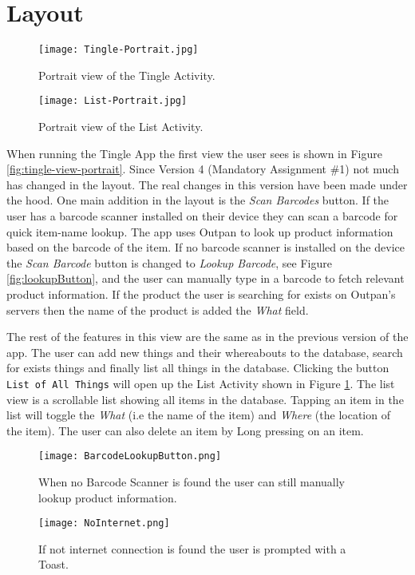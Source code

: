 \section{Layout}

\begin{figure}[!htb]
		\centering
		\texttt{[image: Tingle-Portrait.jpg]}
		\caption{Portrait view of the Tingle Activity.}
		\label{fig:tingle-view-portrait}
	\endminipage\hfill
		\centering
		\texttt{[image: List-Portrait.jpg]}
		\caption{Portrait view of the List Activity.}
		\label{fig:list-view-portrait}
	\endminipage\hfill
\end{figure}

When running the Tingle App the first view the user sees is shown in Figure \ref{fig:tingle-view-portrait}. Since Version 4 (Mandatory Assignment \#1) not much has changed in the layout. The real changes in this version have been made under the hood. One main addition in the layout is the \emph{Scan Barcodes} button. If the user has a barcode scanner installed on their device they can scan a barcode for quick item-name lookup. The app uses Outpan to look up product information based on the barcode of the item. If no barcode scanner is installed on the device the \emph{Scan Barcode} button is changed to \emph{Lookup Barcode}, see Figure \ref{fig:lookupButton}, and the user can manually type in a barcode to fetch relevant product information. If the product the user is searching for exists on Outpan's servers then the name of the
product is added the \emph{What} field.

The rest of the features in this view are the same as in the previous version of the app. The user can add new things and their whereabouts to the database, search for exists things and finally list all things in the database. Clicking the button \texttt{List of All Things} will open up the List Activity shown in Figure \ref{fig:list-view-portrait}. The list view is a scrollable list showing all items in the database. Tapping an item in the list will toggle the \emph{What} (i.e the name of the item) and \emph{Where} (the location of the item). The user can also delete an item by Long pressing on an item.

\begin{figure}[!htb]
	\centering
	\texttt{[image: BarcodeLookupButton.png]}
	\caption{When no Barcode Scanner is found the user can still manually lookup product information.}
	\label{fig:lookupButton}
	\endminipage\hfill
	\centering
	\texttt{[image: NoInternet.png]}
	\caption{If not internet connection is found the user is prompted with a Toast.}
	\label{fig:noInternet}
	\endminipage\hfill
\end{figure}


